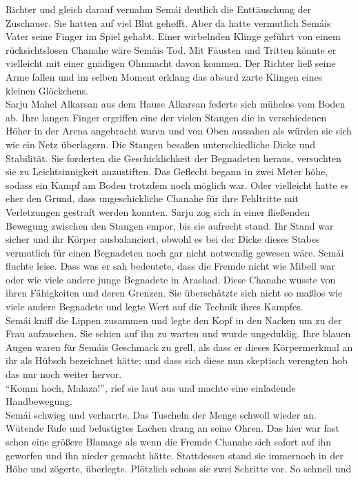 Richter und gleich darauf vernahm Semái deutlich die Enttäuschung der Zuschauer. Sie hatten auf 
viel Blut gehofft. Aber da hatte vermutlich Semáis Vater seine Finger im Spiel gehabt. Einer 
wirbelnden Klinge geführt von einem rücksichtslosen Chanahe wäre Semáis Tod. Mit Fäusten und 
Tritten könnte er vielleicht mit einer gnädigen Ohnmacht davon kommen. Der Richter ließ seine Arme 
fallen und im selben Moment erklang das absurd zarte Klingen eines kleinen Glöckchens.\\
Sarju Mahel Alkarsan aus dem Hause Alkarsan federte sich mühelos vom Boden ab. Ihre langen Finger 
ergriffen eine der vielen Stangen die in verschiedenen Höher in der Arena angebracht waren und von 
Oben aussahen als würden sie sich wie ein Netz überlagern. Die Stangen besaßen unterschiedliche 
Dicke und Stabilität. Sie forderten die Geschicklichkeit der Begnadeten heraus, versuchten sie zu 
Leichtsinnigkeit anzustiften. Das Geflecht begann in zwei Meter höhe, sodass ein Kampf am Boden 
trotzdem noch möglich war. Oder vielleicht hatte es eher den Grund, dass ungeschickliche Chanahe 
für ihre Fehltritte mit Verletzungen gestraft werden konnten. Sarju zog sich in einer fließenden 
Bewegung zwischen den Stangen empor, bis sie aufrecht stand. Ihr Stand war sicher und ihr Körper 
ausbalanciert, obwohl es bei der Dicke dieses Stabes vermutlich für einen Begnadeten noch gar nicht 
notwendig gewesen wäre. Semái fluchte leise. Dass was er sah bedeutete, dass die Fremde nicht wie 
Mibell war oder wie viele andere junge Begnadete in Arashad. Diese Chanahe wusste von ihren 
Fähigkeiten und deren Grenzen. Sie überschätzte sich nicht so maßlos wie viele andere Begnadete und 
legte Wert auf die Technik ihres Kampfes.\\
Semái kniff die Lippen zusammen und legte den Kopf in den Nacken um zu der Frau aufzusehen. Sie 
schien auf ihn zu warten und wurde ungeduldig. Ihre blauen Augen waren für Semáis Geschmack zu 
grell, als dass er dieses Körpermerkmal an ihr als Hübsch bezeichnet hätte; und dass sich diese nun 
skeptisch verengten hob das nur noch weiter hervor.\\
``Komm hoch, Malaza!'', rief sie laut aus und machte eine einladende Handbewegung.\\
Semái schwieg und verharrte. Das Tuscheln der Menge schwoll wieder an. Wütende Rufe und belustigtes 
Lachen drang an seine Ohren. Das hier war fast schon eine größere Blamage als wenn die Fremde 
Chanahe sich sofort auf ihn geworfen und ihn nieder gemacht hätte. Stattdessen stand sie immernoch 
in der Höhe und zögerte, überlegte. Plötzlich schoss sie zwei Schritte vor. So schnell und 
